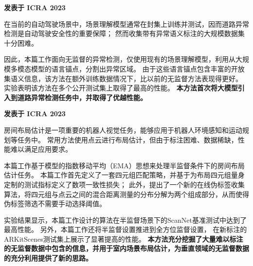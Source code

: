 \documentclass{resume}
\begin{document}
\begin{spacing}{1.2}
  \textbf{发表于 ICRA 2023}

  \vspace{0.5em}
  在当前的自动驾驶场景中，场景理解模型通常在封集上训练并测试，因而道路异常检测是自动驾驶安全性的重要保障；
  然而收集带有异常语义标注的大规模数据集十分困难。

  \vspace{0.5em}
  因此，本篇工作面向无监督的异常检测，仅使用现有的场景理解模型，利用从大规模多模态模型的语言锚点，分割出异常区域。
  由于这些语言锚点包含丰富的开放集语义信息，该方法在额外训练数据情况下，比以前的无监督方法表现得更好。
  实验表明该方法在多个公开测试集上取得了最高的性能。
  \textbf{本方法首次将大模型引入到道路异常检测任务中，并取得了优越性能。}
\end{spacing}

\begin{spacing}{1.2}
  \textbf{发表于 ICRA 2023}

  \vspace{0.5em}
  房间布局估计是一项重要的机器人视觉任务，能够应用于机器人环境感知和运动规划等任务中。
  常用方法使用点云进行布局估计，但由于标注困难、数据稀缺，性能难以满足应用要求。
  
  \vspace{0.5em}
  本篇工作基于模型的指数移动平均（EMA）思想来处理半监督条件下的房间布局估计任务。
  本篇工作首先定义了一套四元组匹配策略，并基于为布局四元组量身定制的测试指标定义了数项一致性损失；
  此外，提出了一个新的在线伪标签收集算法，将四元组与点云之间的混合距离测量的分布分解为两个组成部分，从而使得伪标签筛选不需要手动选择阈值。
  
  \vspace{0.5em}
  实验结果显示，本篇工作设计的算法在半监督场景下的ScanNet基准测试中达到了最高性能。
  另外，本篇工作还将半监督设置推进到全方位监督设置， 在新标注的ARKitScenes测试集上展示了显著提高的性能。
  \textbf{本方法充分挖掘了大量难以标注的无监督数据中包含的信息，并用于室内场景布局估计，为垂直领域的无监督数据的充分利用提供了新的思路。}
\end{spacing}
\end{document}
